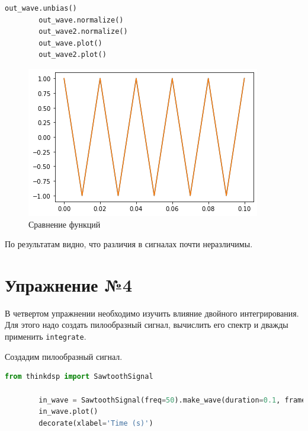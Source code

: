 \documentclass[a4paper, 14pt]{extarticle}
\begin{document}
    \begin{lstlisting}[language=Python, caption= Сравнение cumsum и integrate, label={lst:cumsum_integrate_compare}]
        out_wave.unbias()
        out_wave.normalize()
        out_wave2.normalize()
        out_wave.plot()
        out_wave2.plot()
    \end{lstlisting}

    \begin{figure}[H]
        \centering
        \includegraphics[width=0.8\linewidth]{cumsum_integrate_compare}
        \caption{Сравнение функций}
        \label{fig:cumsum_integrate_compare}
    \end{figure}

    По результатам видно, что различия в сигналах почти неразличимы.

    \newpage


    \section{Упражнение №4}
    \label{sec:4}

    В четвертом упражнении необходимо изучить влияние двойного интегрирования.
    Для этого надо создать пилообразный сигнал, вычислить его спектр и дважды применить \texttt{integrate}.

    Создадим пилообразный сигнал.

    \begin{lstlisting}[language=Python, caption= Создание пилообразного сигнала, label={lst:make_sawtooth_signal}]
        from thinkdsp import SawtoothSignal

        in_wave = SawtoothSignal(freq=50).make_wave(duration=0.1, framerate=44100)
        in_wave.plot()
        decorate(xlabel='Time (s)')
    \end{lstlisting}
\end{document}
